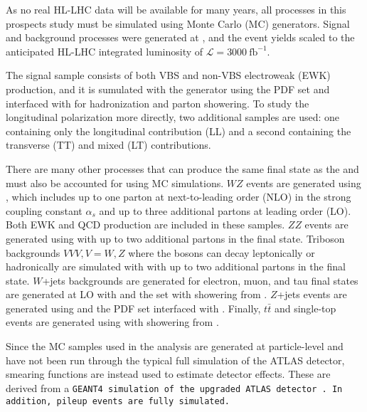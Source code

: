 As no real HL-LHC data will be available for many years, all processes in this prospects study must be simulated using Monte Carlo (MC) generators. 
Signal and background processes were generated at , and the event yields scaled to the anticipated HL-LHC integrated luminosity of $\mathcal{L}=3000~\textrm{fb}^{-1}$.


The signal sample consists of both VBS and non-VBS electroweak (EWK) \ssww production, and it is sumulated with the \mcatnlo generator \cite{2014.madgraph_mcnlo} using the \nnpdf PDF set \cite{2015.NNPDF3} and interfaced with  \cite{2015.pythia82} for hadronization and parton showering.
To study the longitudinal polarization more directly, two additional \mcatnlo \ssww samples are used: one containing only the longitudinal contribution (LL) and a second containing the transverse (TT) and mixed (LT) contributions.

There are many other processes that can produce the same final state as the \ssww and must also be accounted for using MC simulations.
$WZ$ events are generated using  \cite{2009.Sherpa, 2008.CS_Shower, 2009.METS}, which includes up to one parton at next-to-leading order (NLO) in the strong coupling constant $\alpha_s$ and up to three additional partons at leading order (LO).  
Both EWK and QCD production are included in these samples.
$ZZ$ events are generated using  with up to two additional partons in the final state.
Triboson backgrounds $VVV, V = W, Z$ where the bosons can decay leptonically or hadronically are simulated with  with up to two additional partons in the final state.
$W$+jets backgrounds are generated for electron, muon, and tau final states are generated at LO with \mcatnlo and the \nnpdf set with showering from .
$Z$+jets events are generated using \powhegbox \cite{2010.powhegbox} and the \ctten PDF set \cite{2010.ct10} interfaced with .
Finally, $t\bar{t}$ and single-top events are generated using \powhegbox with showering from .

Since the MC samples used in the analysis are generated at particle-level and have not been run through the typical full simulation of the ATLAS detector, smearing functions are instead used to estimate detector effects.
These are derived from a \tt{GEANT4} simulation of the upgraded ATLAS detector \cite{2003.GEANT4}.
In addition, pileup events are fully simulated.
